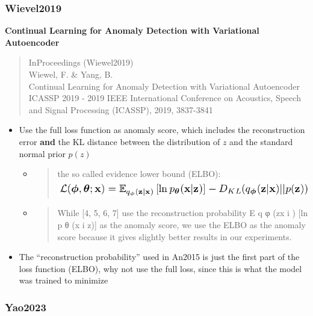 \documentclass[
  letterpaper,
  DIV=11,
  numbers=noendperiod]{scrartcl}
\begin{document}
\subsubsection{Wievel2019}\label{wievel2019}

\textbf{Continual Learning for Anomaly Detection with Variational
Autoencoder}

\begin{quote}
InProceedings (Wiewel2019)\\
Wiewel, F. \& Yang, B.\\
Continual Learning for Anomaly Detection with Variational Autoencoder\\
ICASSP 2019 - 2019 IEEE International Conference on Acoustics, Speech
and Signal Processing (ICASSP), 2019, 3837-3841
\end{quote}

\begin{itemize}
\item
  Use the full loss function as anomaly score, which includes the
  reconstruction error \textbf{and} the KL distance between the
  distribution of \(z\) and the standard normal prior \(p(z)\)

  \begin{itemize}
  \item
    \begin{quote}
    the so called evidence lower bound (ELBO):
    \includegraphics{img/2023-01-16-17-50-43.png}
    \end{quote}
  \item
    \begin{quote}
    While {[}4, 5, 6, 7{]} use the reconstruction probability E q φ
    (z\textbar x i ) {[}ln p θ (x i \textbar z){]} as the anomaly score,
    we use the ELBO as the anomaly score because it gives slightly
    better results in our experiments.
    \end{quote}
  \end{itemize}
\item
  The ``reconstruction probability'' used in An2015 is just the first
  part of the loss function (ELBO), why not use the full loss, since
  this is what the model was trained to minimize
\end{itemize}

\subsubsection{Yao2023}\label{yao2023}
\end{document}
